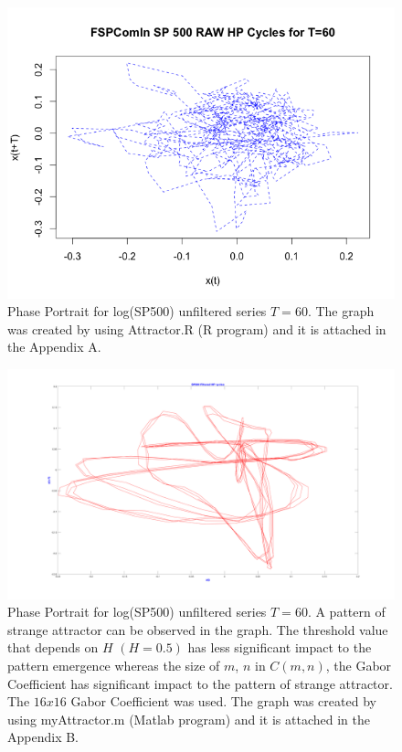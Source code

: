 \begin{figure}[!ht]
\includegraphics[scale=.7]{Images/SP500RawChaos}
\caption{Phase Portrait for log(SP500) unfiltered series $T= 60$. The graph was created by using Attractor.R (R program) and it is attached in the Appendix A.}
\label{fig:SP500RawChaos}
\end{figure}

\begin{figure}[!ht]
\includegraphics[scale=.15]{Images/SPFiltAttract}
\caption{Phase Portrait for log(SP500) unfiltered series $T= 60$. A pattern of strange attractor can be observed in the graph. The threshold value that depends on $H$ $(H = 0.5)$ has less significant impact to the pattern emergence whereas the size of $m$, $n$ in $C(m,n)$, the Gabor Coefficient has significant impact to the pattern of strange attractor. The $16 x 16$ Gabor Coefficient was used. The graph was created by using myAttractor.m (Matlab program) and it is attached in the Appendix B.}
\label{fig:SPFiltAttract}
\end{figure}

